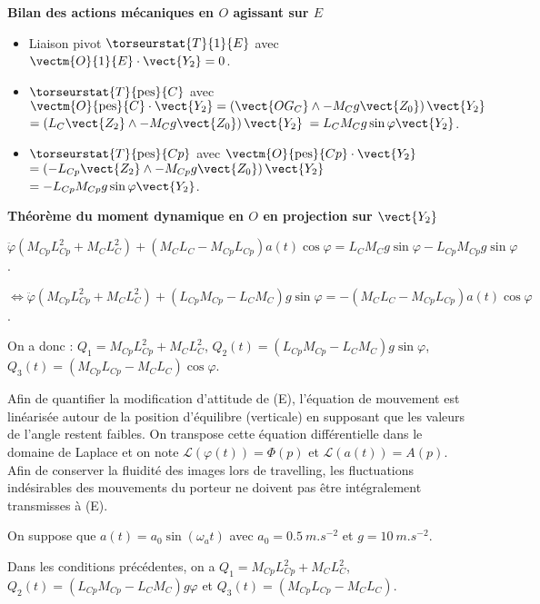 \begin{multicols}{2}
\begin{corrige}
\textbf{Bilan des actions mécaniques en $O$ agissant sur $E$}
\begin{itemize}
\item Liaison pivot $\torseurstat{T}{1}{E}$ avec $\vectm{O}{1}{E}\cdot \vect{Y_2}=0$. 
\item $\torseurstat{T}{\text{pes}}{C}$ avec $\vectm{O}{\text{pes}}{C}\cdot \vect{Y_2}=\left( \vect{OG_C}\wedge -M_Cg \vect{Z_0}\right) \vect{Y_2}$ $=\left( L_C\vect{Z_2}\wedge -M_Cg \vect{Z_0}\right) \vect{Y_2}$
$= L_CM_Cg \sin \varphi  \vect{Y_2}$. 
\item $\torseurstat{T}{\text{pes}}{Cp}$ avec $\vectm{O}{\text{pes}}{Cp}\cdot \vect{Y_2}$%
$=\left( -L_{Cp}\vect{Z_2}\wedge -M_{Cp}g \vect{Z_0}\right) \vect{Y_2}$
$=- L_{Cp}M_{Cp}g \sin \varphi  \vect{Y_2}$. 
\end{itemize}

\textbf{Théorème du moment dynamique en $O$ en projection sur $\vect{Y_2}$}

$\ddot{\varphi}\left(M_{Cp}L_{Cp}^2+M_{C}L_{C}^2 \right)+\left( M_CL_C-M_{Cp}L_{Cp}\right)  a(t)\cos\varphi =
 L_CM_Cg \sin \varphi- L_{Cp}M_{Cp}g \sin \varphi $.

$\Leftrightarrow \ddot{\varphi}\left(M_{Cp}L_{Cp}^2+M_{C}L_{C}^2 \right)
+\left(   L_{Cp}M_{Cp} - L_CM_C \right)g \sin \varphi=
  - \left( M_CL_C-M_{Cp}L_{Cp}\right)  a(t)\cos\varphi $.

On a donc : 
$Q_1 = M_{Cp}L_{Cp}^2+M_{C}L_{C}^2 $, $Q_2(t)=\left(   L_{Cp}M_{Cp} - L_CM_C \right)g \sin \varphi$, 
$Q_3(t)= \left(M_{Cp}L_{Cp}- M_CL_C\right)  \cos\varphi$.
\end{corrige}
\else
\fi
 
 
\ifprof
\else
Afin de quantifier la modification d’attitude de (E), l'équation de mouvement est linéarisée autour de la position
d'équilibre (verticale) en supposant que les valeurs de l'angle restent faibles. On transpose cette équation
différentielle dans le domaine de Laplace et on note $\mathcal{L}\left(\varphi(t) \right)=\Phi(p)$ et $\mathcal{L}\left(a(t) \right)=A(p)$. 
Afin de conserver la fluidité des images lors de travelling, les fluctuations indésirables des mouvements du porteur ne
doivent pas être intégralement transmisses à (E).

On suppose que $a(t)=a_0\sin \left( \omega_a t\right)$ avec $a_0=\SI{0,5}{m.s^{-2}}$ et $g=\SI{10}{m.s^{-2}}$.
\fi

\ifprof
\begin{corrige}
Dans les conditions précédentes, on a $Q_1 = M_{Cp}L_{Cp}^2+M_{C}L_{C}^2 $, $Q_2(t)=\left(   L_{Cp}M_{Cp} - L_CM_C \right)g  \varphi$ et $Q_3(t)=  \left(M_{Cp}L_{Cp}- M_CL_C\right)$.


\end{corrige}
\end{multicols}
